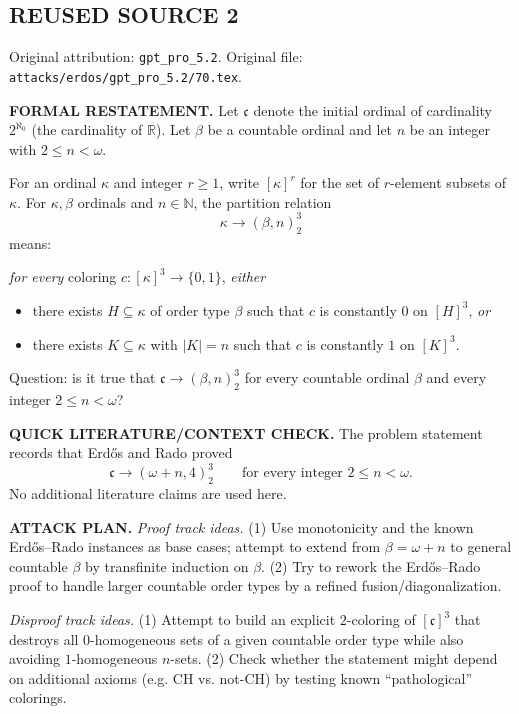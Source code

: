 
\subsection*{REUSED SOURCE 2}
Original attribution: \texttt{gpt\_pro\_5.2}.
Original file: \texttt{attacks/erdos/gpt\_pro\_5.2/70.tex}.


\noindent\textbf{FORMAL RESTATEMENT.}
Let $\mathfrak c$ denote the initial ordinal of cardinality $2^{\aleph_0}$ (the cardinality of $\mathbb R$). Let $\beta$ be a countable ordinal and let $n$ be an integer with $2\le n<\omega$.

For an ordinal $\kappa$ and integer $r\ge 1$, write $[\kappa]^r$ for the set of $r$-element subsets of $\kappa$.
For $\kappa,\beta$ ordinals and $n\in\mathbb N$, the partition relation
\[\kappa\to(\beta,n)_2^3\]
means:

\emph{for every} coloring $c:[\kappa]^3\to\{0,1\}$, \emph{either}
\begin{itemize}
\item there exists $H\subseteq\kappa$ of order type $\beta$ such that $c$ is constantly $0$ on $[H]^3$, \emph{or}
\item there exists $K\subseteq\kappa$ with $|K|=n$ such that $c$ is constantly $1$ on $[K]^3$.
\end{itemize}

Question: is it true that $\mathfrak c\to(\beta,n)_2^3$ for every countable ordinal $\beta$ and every integer $2\le n<\omega$?

\medskip
\noindent\textbf{QUICK LITERATURE/CONTEXT CHECK.}
The problem statement records that Erd\H{o}s and Rado proved
\[\mathfrak c\to(\omega+n,4)_2^3\qquad\text{for every integer }2\le n<\omega.
\]
No additional literature claims are used here.

\medskip
\noindent\textbf{ATTACK PLAN.}
\emph{Proof track ideas.}
(1) Use monotonicity and the known Erd\H{o}s--Rado instances as base cases; attempt to extend from $\beta=\omega+n$ to general countable $\beta$ by transfinite induction on $\beta$.
(2) Try to rework the Erd\H{o}s--Rado proof to handle larger countable order types by a refined fusion/diagonalization.

\emph{Disproof track ideas.}
(1) Attempt to build an explicit $2$-coloring of $[\mathfrak c]^3$ that destroys all $0$-homogeneous sets of a given countable order type while also avoiding $1$-homogeneous $n$-sets.
(2) Check whether the statement might depend on additional axioms (e.g. CH vs. not-CH) by testing known ``pathological'' colorings.

